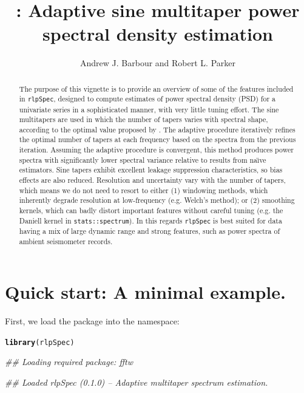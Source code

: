 \documentclass{article}\usepackage{graphicx, color}
\author{Andrew J. Barbour and Robert L. Parker}
\title{\rlp{}: Adaptive sine multitaper power spectral density estimation}
\makeatletter
\newcommand{\hlfunctioncall}[1]{\textcolor[rgb]{0.501960784313725,0,0.329411764705882}{\textbf{#1}}}%
\newenvironment{kframe}{%
 \def\at@end@of@kframe{}%
 \ifinner\ifhmode%
  \def\at@end@of@kframe{\end{minipage}}%
  \begin{minipage}{\columnwidth}%
 \fi\fi%
 \def\FrameCommand##1{\hskip\@totalleftmargin \hskip-\fboxsep
 \colorbox{shadecolor}{##1}\hskip-\fboxsep
     \hskip-\linewidth \hskip-\@totalleftmargin \hskip\columnwidth}%
 \MakeFramed {\advance\hsize-\width
   \@totalleftmargin\z@ \linewidth\hsize
   \@setminipage}}%
 {\par\unskip\endMakeFramed%
 \at@end@of@kframe}
\newenvironment{knitrout}{}{} %
\newcommand{\Rcmd}[1]{\texttt{#1}}
\newcommand{\rlp}[0]{\Rcmd{rlpSpec}}
\newcommand{\naive}[0]{na\"{\i}ve}
\makeatother
\begin{document}
\maketitle
\begin{abstract}
  The purpose of this vignette is to provide an overview of some of the
  features included in \rlp{}, designed to
  compute estimates of power spectral
  density (PSD) for a univariate series in a sophisticated manner,
  with very little tuning effort.
  The sine multitapers are used in which
  the number of tapers varies with spectral shape, according
  to the optimal value proposed by \citet{rs1995}.
  The adaptive procedure
  iteratively refines the optimal number of tapers at each frequency
  based on the spectra from the previous iteration.
  Assuming the adaptive procedure is convergent, 
  this method produces power spectra
  with significantly
  lower spectral variance 
  relative to results from \naive{} estimators.
  Sine tapers exhibit excellent
  leakage suppression characteristics, so bias effects
  are also reduced.
  Resolution and uncertainty vary with the number of tapers,
  which means we do
  not need to resort to either (1) windowing methods,
  which inherently degrade resolution at low-frequency
  (e.g. Welch's method); or (2) smoothing kernels,
  which can badly distort important features without careful tuning
  (e.g. the Daniell kernel in \Rcmd{stats::spectrum}).
  In this regards
  \rlp{} is best suited for data having a mix of
   large dynamic range and strong features, such
   as power spectra of ambient seismometer records.
\end{abstract}

\tableofcontents
\pagebreak

\section{Quick start: A minimal example.}
First, we load the package into the namespace:
\begin{knitrout}
\color{fgcolor}\begin{kframe}
\begin{alltt}
\hlfunctioncall{library}(rlpSpec)
\end{alltt}


{\ttfamily\noindent\itshape\textcolor{messagecolor}{\#\# Loading required package: fftw}}

{\ttfamily\noindent\itshape\textcolor{messagecolor}{\#\# Loaded rlpSpec (0.1.0) -- Adaptive multitaper spectrum estimation.}}\end{kframe}
\end{knitrout}
\end{document}
